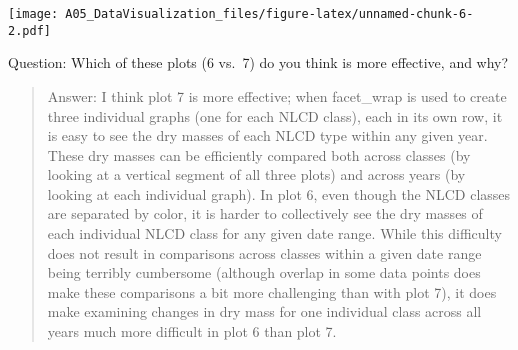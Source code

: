 \documentclass[]{article}
\begin{document}
\texttt{[image: A05\_DataVisualization\_files/figure-latex/unnamed-chunk-6-2.pdf]}

Question: Which of these plots (6 vs.~7) do you think is more effective,
and why?

\begin{quote}
Answer: I think plot 7 is more effective; when facet\_wrap is used to
create three individual graphs (one for each NLCD class), each in its
own row, it is easy to see the dry masses of each NLCD type within any
given year. These dry masses can be efficiently compared both across
classes (by looking at a vertical segment of all three plots) and across
years (by looking at each individual graph). In plot 6, even though the
NLCD classes are separated by color, it is harder to collectively see
the dry masses of each individual NLCD class for any given date range.
While this difficulty does not result in comparisons across classes
within a given date range being terribly cumbersome (although overlap in
some data points does make these comparisons a bit more challenging than
with plot 7), it does make examining changes in dry mass for one
individual class across all years much more difficult in plot 6 than
plot 7.
\end{quote}
\end{document}
